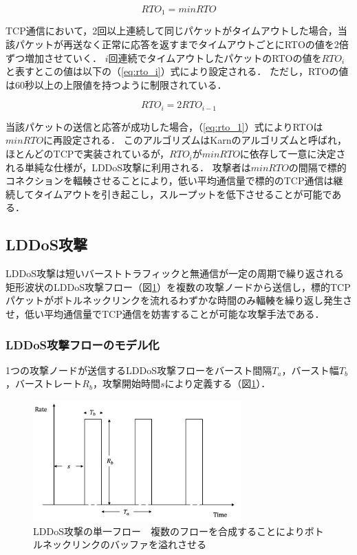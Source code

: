 \documentclass[Japanese]{dicomopapers}
\begin{document}
\begin{equation}
    \label{eq:rto_1}
    RTO_1 = minRTO
\end{equation}

TCP通信において，2回以上連続して同じパケットがタイムアウトした場合，当該パケットが再送なく正常に応答を返すまでタイムアウトごとにRTOの値を2倍ずつ増加させていく．
$i$回連続でタイムアウトしたパケットのRTOの値を$RTO_i$と表すとこの値は以下の（\ref{eq:rto_i}）式により設定される．
ただし，RTOの値は60秒以上の上限値を持つように制限されている．

\begin{equation}
    \label{eq:rto_i}
    RTO_i = 2RTO_{i-1}
\end{equation}

当該パケットの送信と応答が成功した場合，（\ref{eq:rto_1}）式によりRTOは$minRTO$に再設定される．
このアルゴリズムはKarnのアルゴリズムと呼ばれ，ほとんどのTCPで実装されているが，$RTO_i$が$minRTO$に依存して一意に決定される単純な仕様が，LDDoS攻撃に利用される．
攻撃者は$minRTO$の間隔で標的コネクションを輻輳させることにより，低い平均通信量で標的のTCP通信は継続してタイムアウトを引き起こし，スループットを低下させることが可能である．

\subsection{LDDoS攻撃}
LDDoS攻撃は短いバーストトラフィックと無通信が一定の周期で繰り返される矩形波状のLDDoS攻撃フロー（図\ref{fig:LDoS-flow}）を複数の攻撃ノードから送信し，標的TCPパケットがボトルネックリンクを流れるわずかな時間のみ輻輳を繰り返し発生させ，低い平均通信量でTCP通信を妨害することが可能な攻撃手法である\cite{ldos}．

\subsubsection{LDDoS攻撃フローのモデル化}
1つの攻撃ノードが送信するLDDoS攻撃フローをバースト間隔$T_a$，バースト幅$T_b$，バーストレート$R_b$，攻撃開始時間$s$により定義する（図\ref{fig:LDoS-flow}）．

\begin{figure}[htbp]
    \begin{center}
        \includegraphics[clip,width=8.0cm]{images/LDoS-flow.png}
        \caption{LDDoS攻撃の単一フロー　複数のフローを合成することによりボトルネックリンクのバッファを溢れさせる}
        \label{fig:LDoS-flow}
    \end{center}
\end{figure}
\end{document}
